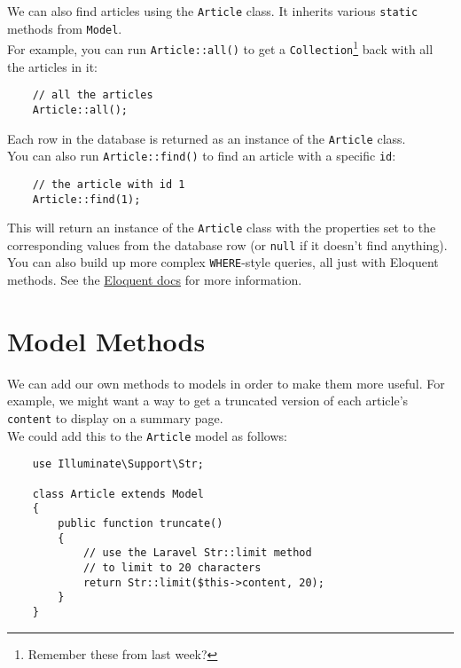 We can also find articles using the \texttt{Article} class. It inherits various \texttt{static} methods from \texttt{Model}.
\\

For example, you can run \texttt{Article::all()} to get a \texttt{Collection}\footnote{Remember these from last week?} back with all the articles in it:

\begin{verbatim}
    // all the articles
    Article::all();
\end{verbatim}

Each row in the database is returned as an instance of the \texttt{Article} class.
\\

You can also run \texttt{Article::find()} to find an article with a specific \texttt{id}:

\begin{verbatim}
    // the article with id 1
    Article::find(1);
\end{verbatim}

This will return an instance of the \texttt{Article} class with the properties set to the corresponding values from the database row (or \texttt{null} if it doesn't find anything).
\\

You can also build up more complex \texttt{WHERE}-style queries, all just with Eloquent methods. See the \href{http://laravel.com/docs/master/eloquent}{Eloquent docs} for more information.


\section{Model Methods}

We can add our own methods to models in order to make them more useful. For example, we might want a way to get a truncated version of each article's \texttt{content} to display on a summary page.
\\

We could add this to the \texttt{Article} model as follows:

\begin{verbatim}
    use Illuminate\Support\Str;

    class Article extends Model
    {
        public function truncate()
        {
            // use the Laravel Str::limit method
            // to limit to 20 characters
            return Str::limit($this->content, 20);
        }
    }
\end{verbatim}

